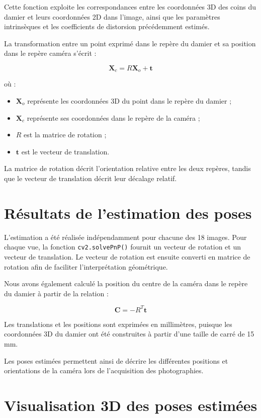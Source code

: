 \documentclass[12pt,a4paper]{report}
\begin{document}
Cette fonction exploite les correspondances entre les coordonnées 3D
des coins du damier et leurs coordonnées 2D dans l'image, ainsi que
les paramètres intrinsèques et les coefficients de distorsion
précédemment estimés.

La transformation entre un point exprimé dans le repère du damier
et sa position dans le repère caméra s'écrit :

\[
\mathbf{X}_c = R\mathbf{X}_o + \mathbf{t}
\]

où :
\begin{itemize}
    \item $\mathbf{X}_o$ représente les coordonnées 3D du point dans
    le repère du damier ;
    \item $\mathbf{X}_c$ représente ses coordonnées dans le repère
    de la caméra ;
    \item $R$ est la matrice de rotation ;
    \item $\mathbf{t}$ est le vecteur de translation.
\end{itemize}

La matrice de rotation décrit l'orientation relative entre les deux
repères, tandis que le vecteur de translation décrit leur décalage
relatif.

\section{Résultats de l'estimation des poses}

L'estimation a été réalisée indépendamment pour chacune des 18 images.
Pour chaque vue, la fonction \texttt{cv2.solvePnP()} fournit un vecteur
de rotation et un vecteur de translation. Le vecteur de rotation est
ensuite converti en matrice de rotation afin de faciliter
l'interprétation géométrique.

Nous avons également calculé la position du centre de la caméra dans
le repère du damier à partir de la relation :

\[
\mathbf{C} = -R^T\mathbf{t}
\]

Les translations et les positions sont exprimées en millimètres,
puisque les coordonnées 3D du damier ont été construites à partir
d'une taille de carré de 15 mm.

Les poses estimées permettent ainsi de décrire les différentes
positions et orientations de la caméra lors de l'acquisition des
photographies.

\section{Visualisation 3D des poses estimées}
\end{document}
